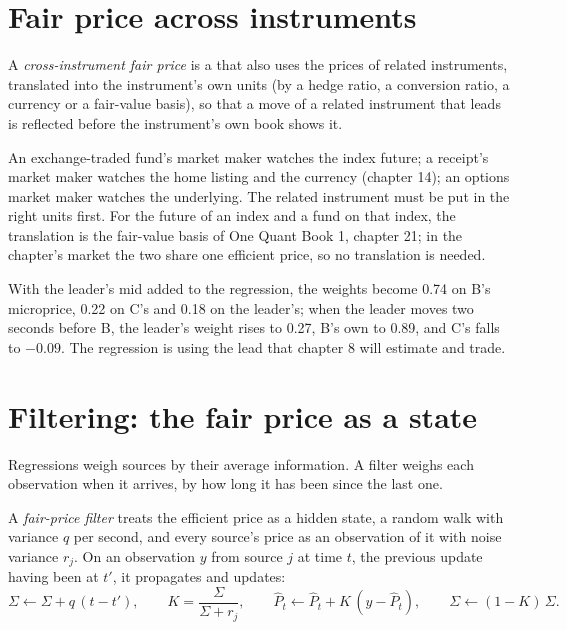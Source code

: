 \section{Fair price across instruments}

\begin{definition}\label{def:hf:fair-value:cross}
A \emph{cross-instrument fair price} is a  that also uses the prices of related instruments, translated
into the instrument's own units (by a hedge ratio, a conversion ratio, a currency or a fair-value basis), so that a move of a related instrument
that leads is reflected before the instrument's own book shows it.
\end{definition}

An exchange-traded fund's market maker watches the index future; a receipt's market maker watches the home listing and the currency (chapter 14);
an options market maker watches the underlying. The related instrument must be put in the right units first. For the future of an index and a fund
on that index, the translation is the fair-value basis of One Quant Book 1, chapter 21; in the chapter's market the two share one efficient price,
so no translation is needed.

With the leader's mid added to the regression, the weights become 0.74 on B's microprice, 0.22 on C's and 0.18 on the leader's; when the leader
moves two seconds before B, the leader's weight rises to 0.27, B's own to 0.89, and C's falls to $-0.09$. The regression is using the lead that chapter 8 will
estimate and trade.

\section{Filtering: the fair price as a state}

Regressions weigh sources by their average information. A filter weighs each observation when it arrives, by how long it has been since the last
one.

\begin{definition}\label{def:hf:fair-value:filter}
A \emph{fair-price filter} treats the efficient price as a hidden state, a random walk with variance $q$ per second, and
every source's price as an observation of it with noise variance $r_j$. On an observation $y$ from source $j$ at time $t$, the previous update
having been at $t'$, it propagates and updates:
\[
\Sigma\leftarrow\Sigma+q\,(t-t'),\qquad K=\frac{\Sigma}{\Sigma+r_j},\qquad \hat P_t\leftarrow\hat P_t+K\,(y-\hat P_t),\qquad \Sigma\leftarrow(1-K)\,\Sigma .
\]
\end{definition}

